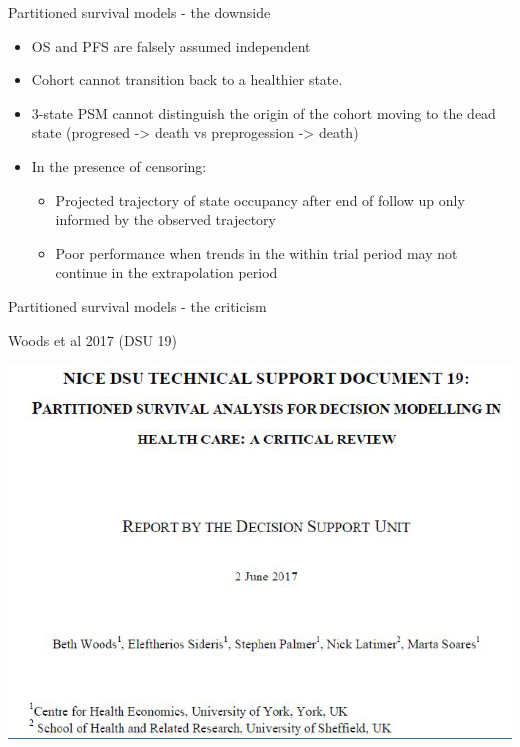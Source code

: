 \documentclass[
  ignorenonframetext,
]{beamer}
\providecommand{\tightlist}{%
  \setlength{\itemsep}{0pt}\setlength{\parskip}{0pt}}
\begin{document}
\begin{frame}{Partitioned survival models - the downside}
\protect\hypertarget{partitioned-survival-models---the-downside}{}

\begin{itemize}
\tightlist
\item
  OS and PFS are falsely assumed independent
\item
  Cohort cannot transition back to a healthier state.
\item
  3-state PSM cannot distinguish the origin of the cohort moving to the
  dead state (progresed -\textgreater{} death vs preprogession
  -\textgreater{} death)
\item
  In the presence of censoring:

  \begin{itemize}
  \tightlist
  \item
    Projected trajectory of state occupancy after end of follow up only
    informed by the observed trajectory
  \item
    Poor performance when trends in the within trial period may not
    continue in the extrapolation period
  \end{itemize}
\end{itemize}

\end{frame}

\begin{frame}{Partitioned survival models - the criticism}
\protect\hypertarget{partitioned-survival-models---the-criticism}{}

Woods et al 2017 (DSU 19)

\includegraphics[width=1\linewidth]{figures/psmcritic}

\end{frame}
\end{document}
